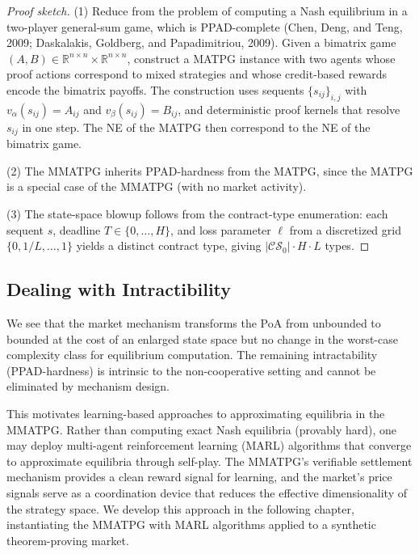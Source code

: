 \begin{proof}[Proof sketch]
(1) Reduce from the problem of computing a Nash equilibrium in a two-player general-sum game, which is PPAD-complete (Chen, Deng, and Teng, 2009; Daskalakis, Goldberg, and Papadimitriou, 2009). Given a bimatrix game $(A,B)\in\mathbb{R}^{n\times n}\times\mathbb{R}^{n\times n}$, construct a MATPG instance with two agents whose proof actions correspond to mixed strategies and whose credit-based rewards encode the bimatrix payoffs. The construction uses sequents $\{s_{ij}\}_{i,j}$ with $v_\alpha(s_{ij}) = A_{ij}$ and $v_\beta(s_{ij}) = B_{ij}$, and deterministic proof kernels that resolve $s_{ij}$ in one step. The NE of the MATPG then correspond to the NE of the bimatrix game.

(2) The MMATPG inherits PPAD-hardness from the MATPG, since the MATPG is a special case of the MMATPG (with no market activity).

(3) The state-space blowup follows from the contract-type enumeration: each sequent $s$, deadline $T\in\{0,\ldots,H\}$, and loss parameter $\ell$ from a discretized grid $\{0,1/L,\ldots,1\}$ yields a distinct contract type, giving $|\mathcal{CS}_0|\cdot H\cdot L$ types.

\end{proof}


\subsection{Dealing with Intractibility}\label{sec:game-summary}

We see that the market mechanism transforms the PoA from unbounded to bounded at the cost of an enlarged state space but no change in the worst-case complexity class for equilibrium computation. The remaining intractability (PPAD-hardness) is intrinsic to the non-cooperative setting and cannot be eliminated by mechanism design.

This motivates learning-based approaches to approximating equilibria in the MMATPG. Rather than computing exact Nash equilibria (provably hard), one may deploy multi-agent reinforcement learning (MARL) algorithms that converge to approximate equilibria through self-play. The MMATPG's verifiable settlement mechanism provides a clean reward signal for learning, and the market's price signals serve as a coordination device that reduces the effective dimensionality of the strategy space. We develop this approach in the following chapter, instantiating the MMATPG with MARL algorithms applied to a synthetic theorem-proving market.